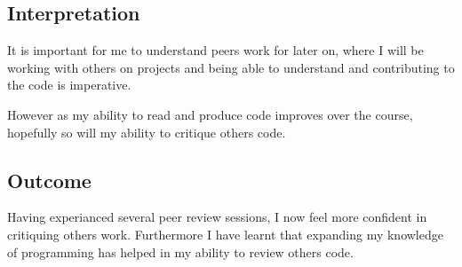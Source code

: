 \documentclass{scrartcl}
\begin{document}
\subsection{Interpretation}

It is important for me to understand peers work for later on, where I will be working with others on projects and being able to understand and contributing to the code is imperative. 

However as my ability to read and produce code improves over the course, hopefully so will my ability to critique others code.

\subsection{Outcome} 

Having experianced several peer review sessions, I now feel more confident in critiquing others work. Furthermore I have learnt that expanding my knowledge of programming has helped in my ability to review others code.
\end{document}

